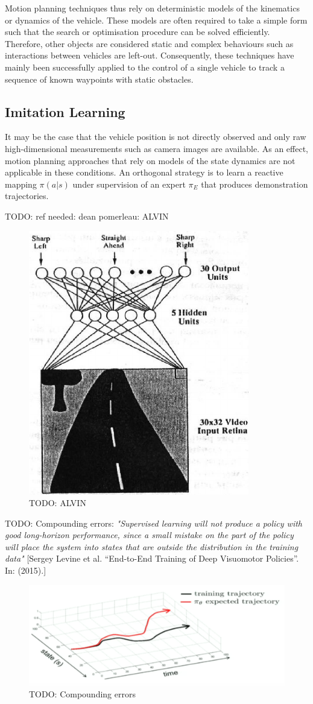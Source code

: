 Motion planning techniques thus rely on deterministic models of the kinematics or dynamics of the vehicle. These models are often required to take a simple form such that the search or optimisation procedure can be solved efficiently. Therefore, other objects are considered static and complex behaviours such as interactions between vehicles are left-out. Consequently, these techniques have mainly been successfully applied to the control of a single vehicle to track a sequence of known waypoints with static obstacles.

\subsection{Imitation Learning}

It may be the case that the vehicle position is not directly observed and only raw high-dimensional measurements such as camera images are available. As an effect, motion planning approaches that rely on models of the state dynamics are not applicable in these conditions. An orthogonal strategy is to learn a reactive mapping $\pi(a|s)$ under supervision of an expert $\pi_E$ that produces demonstration trajectories.

TODO: ref needed: dean pomerleau: ALVIN
\begin{figure}[tp]
	\centering
	\includegraphics[width=0.4\linewidth]{img/alvinn}
	\caption{TODO: ALVIN}
\end{figure}

TODO: Compounding errors: \emph{"Supervised learning will not produce a policy with good long-horizon
performance, since a small mistake on the part of the policy will place the system
into states that are outside the distribution in the training data"} [Sergey Levine et al. “End-to-End Training of Deep Visuomotor Policies”. In: (2015).]

\begin{figure}[tp]
	\centering
	\includegraphics[width=0.7\linewidth]{img/cp4}
	\caption{TODO: Compounding errors}
\end{figure}

